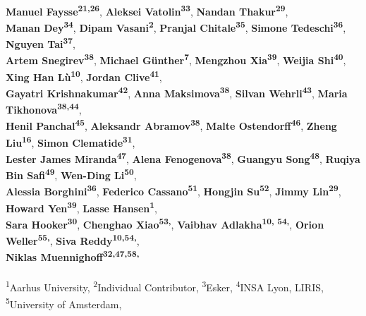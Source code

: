 {\textbf{Manuel Faysse\textsuperscript{21,26}}, 
\textbf{Aleksei Vatolin\textsuperscript{33}}, 
\textbf{Nandan Thakur\textsuperscript{29}}, 
\\
\textbf{Manan Dey\textsuperscript{34}}, 
\textbf{Dipam Vasani\textsuperscript{2}},
\textbf{Pranjal Chitale\textsuperscript{35}}, 
\textbf{Simone Tedeschi\textsuperscript{36}},
\textbf{Nguyen Tai\textsuperscript{37}},  
\\
\textbf{Artem Snegirev\textsuperscript{38}}, 
\textbf{Michael Günther\textsuperscript{7}}, 
\textbf{Mengzhou Xia\textsuperscript{39}}, 
\textbf{Weijia Shi\textsuperscript{40}},
\textbf{Xing Han Lù\textsuperscript{10}}, 
\textbf{Jordan Clive\textsuperscript{41}},  
\\
\textbf{Gayatri Krishnakumar\textsuperscript{42}}, 
\textbf{Anna Maksimova\textsuperscript{38}}, 
\textbf{Silvan Wehrli\textsuperscript{43}}, 
\textbf{Maria Tikhonova\textsuperscript{38,44}}, 
\\
\textbf{Henil Panchal\textsuperscript{45}}, 
\textbf{Aleksandr Abramov\textsuperscript{38}}, 
\textbf{Malte Ostendorff\textsuperscript{46}}, 
\textbf{Zheng Liu\textsuperscript{16}}, 
\textbf{Simon Clematide\textsuperscript{31}},
\\
\textbf{Lester James Miranda\textsuperscript{47}}, 
\textbf{Alena Fenogenova\textsuperscript{38}}, 
\textbf{Guangyu Song\textsuperscript{48}}, 
\textbf{Ruqiya Bin Safi\textsuperscript{49}}, 
\textbf{Wen-Ding Li\textsuperscript{50}},
\\
\textbf{Alessia Borghini\textsuperscript{36}}, 
\textbf{Federico Cassano\textsuperscript{51}}, 
\textbf{Hongjin Su\textsuperscript{52}}, %
\textbf{Jimmy Lin\textsuperscript{29}},  %
\textbf{Howard Yen\textsuperscript{39}}, %
\textbf{Lasse Hansen\textsuperscript{1}}, 
\\
\textbf{Sara Hooker\textsuperscript{30}},
\textbf{Chenghao Xiao\textsuperscript{53,\textdaggerdbl}}, 
\textbf{Vaibhav Adlakha\textsuperscript{10, 54,\textdaggerdbl}}, 
\textbf{Orion Weller\textsuperscript{55,\textdaggerdbl}}, 
\textbf{Siva Reddy\textsuperscript{10,54,\textdaggerdbl}},
\\
\textbf{Niklas Muennighoff\textsuperscript{32,47,58,\textdaggerdbl}}
\\
\\
\textsuperscript{1}Aarhus University, 
\textsuperscript{2}Individual Contributor, 
\textsuperscript{3}Esker, 
\textsuperscript{4}INSA Lyon, LIRIS, 
\\
\textsuperscript{5}University of Amsterdam, 
}
